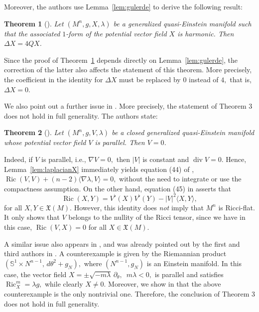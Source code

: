 \documentclass[a4paper, 12pt]{amsart}
\newtheorem{theorem}{Theorem}[]
\theoremstyle{definition}
\numberwithin{figure}{section}
\begin{document}
Moreover, the authors use Lemma~\ref{lem:gulerde} to derive the following result:

\begin{theorem}[{\cite[Theorem 2]{GulerDe2022}}]\label{thm:gulerde}
Let $(M^n,g,X,\lambda)$ be a generalized quasi-Einstein manifold such that
the associated $1$-form of the potential vector field $X$ is harmonic.
Then $\Delta X = 4 QX$.
\end{theorem}

Since the proof of Theorem~\ref{thm:gulerde} depends directly on
Lemma~\ref{lem:gulerde}, the correction of the latter also affects the statement
of this theorem. More precisely, the coefficient in the identity for $\Delta X$
must be replaced by $0$ instead of $4,$ that is, $\Delta X =0$.

We also point out a further issue in \cite{GulerDe2022}. More precisely, the statement of Theorem 3 does  not hold in full generality. The authors state:
\begin{theorem}[{\cite[Theorem 3]{GulerDe2022}}]
Let $(M^n,g,V,\lambda)$ be a closed generalized quasi-Einstein manifold whose potential vector field $V$ is parallel. Then $V=0$.
\end{theorem}

Indeed, if $V$ is parallel, i.e.,
$
\nabla V=0,
$
then $|V|$ is constant and $\operatorname{div}V=0$. Hence, Lemma~\ref{lem:laplacianX} immediately yields equation (44) of \cite{GulerDe2022},
$
\operatorname{Ric}(V,V)+(n-2)\langle\nabla\lambda,V\rangle=0,
$
without the need to integrate or use the compactness assumption.
On the other hand, equation (45) in \cite{GulerDe2022} asserts that
$$
\operatorname{Ric}(X,Y)
=
V^\flat(X)V^\flat(Y)
-
|V|^2 \langle X,Y \rangle,
$$
for all $X,Y\in\mathfrak{X}(M)$. However, this identity does \emph{not} imply that $M^n$ is Ricci-flat. It only shows that $V$ belongs to the nullity of the Ricci tensor, since we have in this case,
$ 
\operatorname{Ric}(V,X)=0
$
for all $X\in\mathfrak{X}(M)$.

A similar issue also appears in \cite[Equation (2.6), Lemma 1 item (3)]{BarrosRibeiro2012}, and was already pointed out by the first and third authors in \cite{CarvalhoCosta}. A counterexample is given by the Riemannian product
$
(\mathbb{S}^1\times N^{n-1},\, d\theta^2+g_N),
$
where $(N^{n-1},g_N)$ is an Einstein manifold.
In this case, the vector field
$
X=\pm\sqrt{-m\lambda}\,\partial_\theta, \,\,\,  m\lambda<0,
$
is parallel and satisfies
$
\operatorname{Ric}_X^m=\lambda g,
$
while clearly
$ 
X\neq0.
$  Moreover, we show in \cite{CarvalhoCosta} that the above counterexample is the only nontrivial one.
Therefore, the conclusion of Theorem 3 does not hold in full generality.
\end{document}
